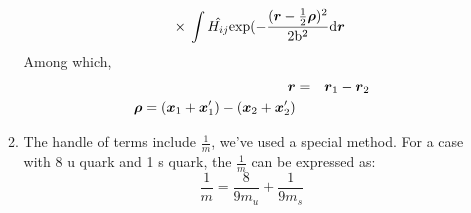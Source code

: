 \documentclass[11pt]{article}
\newcommand{\bm}[1]{\mbox{\boldmath{$#1$}}}
\begin{document}
\begin{enumerate}
\begin{enumerate}
\begin{eqnarray}
&&{}\times{}\int\hat{H_{i j}}\rm{exp}(-\frac{(\bm{r}-\frac{1}{2}\bm{\rho})^2}{2b^2}\rm{d}\bm{r}
\end{eqnarray}
Among which,
\begin{eqnarray}
\bm{r}&=&\bm{r}_1-\bm{r}_2\\
\bm{\rho}=(\bm{x}_{1}+\bm{x}_{1}^\prime)-(\bm{x}_{2}+\bm{x}_{2}^\prime)
\end{eqnarray}
\item The handle of terms include $\frac{1}{m}$, we've used a special method.
For a case with 8 u quark and 1 s quark, the $\frac{1}{m}$ can be expressed as:
\begin{equation}
\frac{1}{m}=\frac{8}{9m_u}+\frac{1}{9m_s}
\end{equation}
\end{enumerate}
\end{enumerate}
\end{document}
